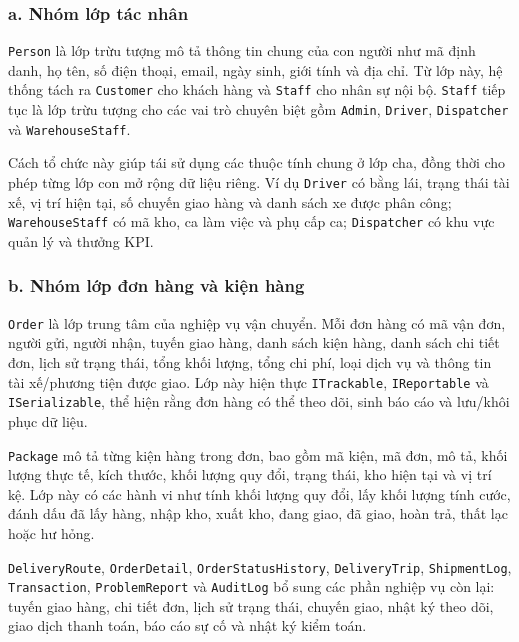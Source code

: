 \documentclass[12pt,a4paper]{article}
\begin{document}
\subsubsection*{a. Nhóm lớp tác nhân}

\texttt{Person} là lớp trừu tượng mô tả thông tin chung của con người như mã định danh, họ tên, số điện thoại, email, ngày sinh, giới tính và địa chỉ. Từ lớp này, hệ thống tách ra \texttt{Customer} cho khách hàng và \texttt{Staff} cho nhân sự nội bộ. \texttt{Staff} tiếp tục là lớp trừu tượng cho các vai trò chuyên biệt gồm \texttt{Admin}, \texttt{Driver}, \texttt{Dispatcher} và \texttt{WarehouseStaff}.

Cách tổ chức này giúp tái sử dụng các thuộc tính chung ở lớp cha, đồng thời cho phép từng lớp con mở rộng dữ liệu riêng. Ví dụ \texttt{Driver} có bằng lái, trạng thái tài xế, vị trí hiện tại, số chuyến giao hàng và danh sách xe được phân công; \texttt{WarehouseStaff} có mã kho, ca làm việc và phụ cấp ca; \texttt{Dispatcher} có khu vực quản lý và thưởng KPI.

\subsubsection*{b. Nhóm lớp đơn hàng và kiện hàng}

\texttt{Order} là lớp trung tâm của nghiệp vụ vận chuyển. Mỗi đơn hàng có mã vận đơn, người gửi, người nhận, tuyến giao hàng, danh sách kiện hàng, danh sách chi tiết đơn, lịch sử trạng thái, tổng khối lượng, tổng chi phí, loại dịch vụ và thông tin tài xế/phương tiện được giao. Lớp này hiện thực \texttt{ITrackable}, \texttt{IReportable} và \texttt{ISerializable}, thể hiện rằng đơn hàng có thể theo dõi, sinh báo cáo và lưu/khôi phục dữ liệu.

\texttt{Package} mô tả từng kiện hàng trong đơn, bao gồm mã kiện, mã đơn, mô tả, khối lượng thực tế, kích thước, khối lượng quy đổi, trạng thái, kho hiện tại và vị trí kệ. Lớp này có các hành vi như tính khối lượng quy đổi, lấy khối lượng tính cước, đánh dấu đã lấy hàng, nhập kho, xuất kho, đang giao, đã giao, hoàn trả, thất lạc hoặc hư hỏng.

\texttt{DeliveryRoute}, \texttt{OrderDetail}, \texttt{OrderStatusHistory}, \texttt{DeliveryTrip}, \texttt{ShipmentLog}, \texttt{Transaction}, \texttt{ProblemReport} và \texttt{AuditLog} bổ sung các phần nghiệp vụ còn lại: tuyến giao hàng, chi tiết đơn, lịch sử trạng thái, chuyến giao, nhật ký theo dõi, giao dịch thanh toán, báo cáo sự cố và nhật ký kiểm toán.
\end{document}
